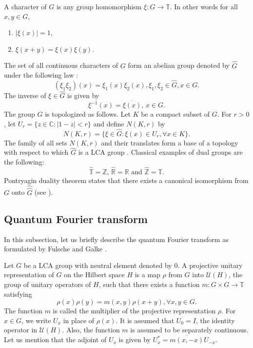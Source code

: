 \documentclass[11pt,a4paper]{amsart}
\begin{document}
A character of $G$ is any group homomorphism $\xi : G\rightarrow \mathbb{T}$. In other words for all $x,y\in G$, 
\begin{enumerate}
\item[i)] $|\xi(x)|=1$,
\item[ii)] $\xi(x+y)=\xi(x)\xi(y)$.
\end{enumerate}
 The set of all continuous characters of $G$ form an abelian group denoted by $\widehat{G}$ under the following law : 
 $$(\xi_1\xi_2)(x)=\xi_1(x)\xi_2(x), \xi_1, \xi_2\in \widehat{G}, x\in G.$$ 
 The inverse of $\xi \in \widehat{G}$ is given by 
 $$\xi^{-1}(x)=\overline{\xi (x)},\, x\in G.$$
The group  $\widehat{G}$ is topologized as follows.  
Let $K$ be a compact subset of $G$.  
 For $r>0$, let $U_r=\{ z\in \mathbb{C} : |1-z|<r\}$ and define $N(K,r)$ by 
 $$N(K,r)=\{\xi\in \widehat{G} : \xi (x)\in U_r, \forall x\in K\}.$$
The family of all sets $N(K,r)$ and their translates form a base of a topology with respect to  which  $\widehat{G}$  is a LCA  group \cite[Section 1.2.6]{Rudin}. 
Classical examples of dual groups are the following:
$$\widehat{\mathbb{T}}=\mathbb{Z},\,\widehat{\mathbb{R}}=\mathbb{R} \mbox{ and }\widehat{\mathbb{Z}}=\mathbb{T}.$$
Pontryagin duality theorem states that there exists a canonical isomorphism from $G$ onto $\widehat{\widehat{G}}$ (see \cite{Hewitt}). 

\subsection{Quantum Fourier transform}
In this subsection, let us briefly describe the quantum Fourier transform as formulated by Fulsche and Galke \cite{Fulsche}. 

Let $G$ be a LCA group with neutral element denoted by 0. A projective unitary representation of $G$ on the Hilbert space $H$ is a map $ \rho$ from $G$ into   $\mathcal{U}(H)$, the group of unitary operators of $H$, such that there exists  a function $m: G\times G \rightarrow \mathbb{T}$ satisfying 
\begin{equation}
\rho(x)\rho(y)=m(x,y)\rho(x+y), \forall x,y\in G.
\end{equation}
 The function $m$ is called the multiplier  of the projective representation $\rho$. For $x\in G$, we write $U_x$ in place of $\rho (x)$. It is assumed that $U_0=I$, the identity operator in $\mathcal{U}(H)$. Also, the function $m$ is assumed to be separately  continuous. Let us mention that the adjoint of  $U_x$ is given by 
 $U_x^*=\overline{m(x,-x)}U_{-x}$.
 
\end{document}
